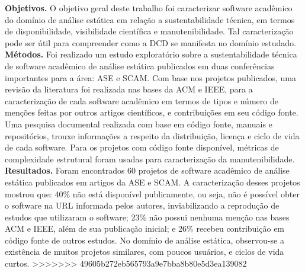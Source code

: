 \textbf{Objetivos.}
O objetivo geral deste trabalho foi
caracterizar software acadêmico do domínio de análise estática
em relação a sustentabilidade técnica,
em termos de disponibilidade, visibilidade científica e manutenibilidade.
Tal caracterização pode ser útil para compreender como a DCD se manifesta
no domínio estudado.
%
\textbf{Métodos.}
Foi realizado um estudo exploratório sobre a sustentabilidade
técnica de software acadêmico de análise estática
publicados em duas conferências importantes para a área: ASE e SCAM.
%
Com base nos projetos publicados,
uma revisão da literatura foi realizada nas bases da ACM e IEEE,
para a caracterização de cada software acadêmico
em termos de tipos e número de menções feitas por outros artigos
científicos,
e contribuições em seu código fonte.
Uma pesquisa documental realizada com base em
código fonte, manuais e repositórios, trouxe informações a respeito da
distribuição, licença e ciclo de vida de cada software.
Para os projetos com código fonte disponível, métricas de
complexidade estrutural foram usadas para caracterização da
manutenibilidade.
%
\textbf{Resultados.}
Foram encontrados 60 projetos de software acadêmico de análise estática
publicados em artigos da ASE e SCAM.
%
A caracterização desses projetos mostrou que:
40\% não está disponível publicamente, ou seja,
não é possível obter o software na URL informada pelos autores,
inviabilizando a reprodução de estudos que utilizaram o software;
%
23\% não possui nenhuma menção nas bases ACM e IEEE, além de sua publicação
inicial; e
26\% recebeu contribuição em código fonte de outros estudos.
No domínio de análise estática, observou-se a existência de muitos projetos
similares, com poucos usuários, e ciclos de vida curtos.
>>>>>>> 49605b272eb565793a9e7bba8b80e5d3ea139082

